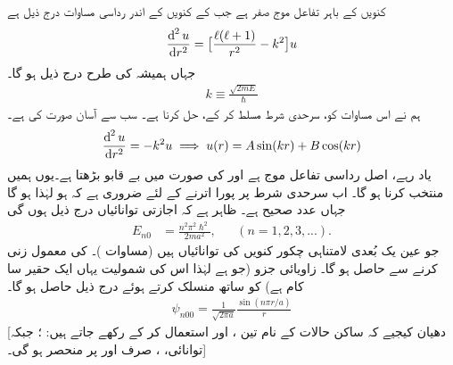 \quad
کنویں  کے باہر تفاعل موج صفر ہے جب کے کنویں  کے اندر رداسی مساوات درج ذیل ہے
\begin{align}\label{مساوات_ابعادی_مربعی_کنواں_الف}
\frac{\dif^{\,2}u}{\dif r^{2}}=\big[\frac{\ell(\ell+1)}{r^{2}}-k^{2}\big]u 
\end{align}
جہاں ہمیشہ کی طرح درج ذیل ہو گا۔
\begin{align}
k\equiv\frac{\sqrt{2mE}}{\hslash} 
\end{align}
ہم نے اس مساوات کو، سرحدی شرط  مسلط کر کے، حل کرنا ہے۔ سب سے آسان صورت  کی ہے۔
\begin{align*}
\frac{\dif^{\,2}u}{\dif r^{2}}=-k^{2}u\implies {u(r)=A\sin(kr)+B\cos(kr)} 
\end{align*}
یاد رہے،  اصل رداسی تفاعل موج  ہے اور   کی صورت میں   بے قابو بڑھتا ہے۔یوں ہمیں  منتخب کرنا ہو گا۔ اب سرحدی شرط پر پورا اترنے کے لئے ضروری ہے  کہ  ہو لہٰذا    ہو گا جہاں   عدد صحیح ہے۔ ظاہر ہے کہ اجازتی توانائیاں درج ذیل ہوں گی
\begin{align}
E_{n0}&=\frac{n^{2}\pi^{2}\hslash^{2}}{2ma^{2}},&&(n=1,2,3,...). 
\end{align}
جو عین یک بُعدی لامتناہی چکور کنویں  کی توانائیاں ہیں (مساوات )۔   کی معمول زنی کرنے   سے  حاصل ہو گا۔ زاویائی جزو (جو   ہے لہٰذا اس کی شمولیت یہاں ایک حقیر سا کام ہے) کو ساتھ منسلک کرتے ہوئے درج ذیل حاصل ہو گا۔ 
\begin{align}
\psi_{n00}=\frac{1}{\sqrt{2\pi a}}\frac{\sin(n\pi r/a)}{r} 
\end{align}
[دھیان کیجیے کہ ساکن حالات کے نام تین  ،  اور  استعمال کر کے رکھے جاتے ہیں: ؛ جبکہ توانائی، ،   صرف  اور  پر منحصر ہو گی۔] 

